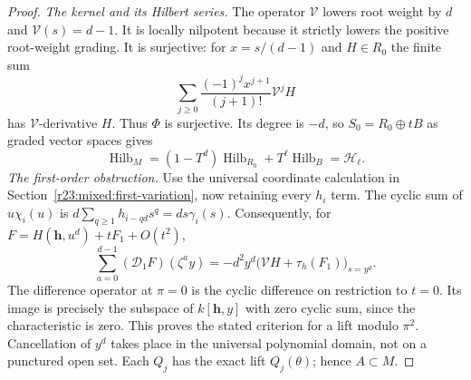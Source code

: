 \documentclass[10pt,fleqn]{article}
\numberwithin{equation}{section}
\newcommand{\Hilb}{\operatorname{Hilb}}
\begin{document}
\begin{proof}
\textit{The kernel and its Hilbert series.}
The operator $\mathcal V$ lowers root weight by $d$ and
$\mathcal V(s)=d-1$.  It is locally nilpotent because it strictly lowers
the positive root-weight grading.  It is surjective: for
$x=s/(d-1)$ and $H\in R_0$ the finite sum
\[
 \sum_{j\ge0}\frac{(-1)^jx^{j+1}}{(j+1)!}\mathcal V^jH
\]
has $\mathcal V$-derivative $H$.  Thus $\Phi$ is surjective.  Its degree is $-d$,
so $S_0=R_0\oplus tB$ as graded vector spaces gives
\[
 \Hilb_M=(1-T^d)\Hilb_{R_0}+T^\ell\Hilb_B=\mathcal H_\ell.
\]
\textit{The first-order obstruction.}
Use the universal coordinate calculation in
Section~\ref{r23:mixed:first-variation}, now retaining every $h_i$ term.
The cyclic sum of $u\chi_i(u)$ is
$d\sum_{q\ge1}h_{i-qd}s^q=d s\gamma_i(s)$.  Consequently, for
$F=H(\mathbf h,u^d)+tF_1+O(t^2)$,
\[
 \sum_{a=0}^{d-1}(\mathscr D_1F)(\zeta^a y)
       =-d^2y^d\bigl(\mathcal VH+\tau_h(F_1)\bigr)_{s=y^d}.
\]
The difference operator at $\pi=0$ is the cyclic difference on
restriction to $t=0$.  Its image is precisely the subspace of
$k[\mathbf h,y]$ with zero cyclic sum, since the characteristic is zero.
This proves the stated criterion for a lift modulo $\pi^2$.
Cancellation of $y^d$ takes place in the universal polynomial domain,
not on a punctured open set.  Each $Q_j$ has the exact lift
$Q_j(\theta)$; hence $A\subset M$.


\end{proof}
\end{document}
